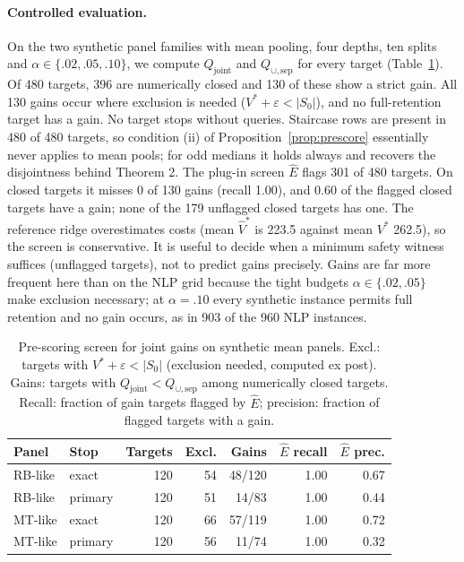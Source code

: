 \documentclass[11pt]{article}
\newcommand{\Qj}{Q_{\mathrm{joint}}}
\newcommand{\Qu}{Q_{\cup,\mathrm{sep}}}
\newcommand{\Sz}{S_0}
\begin{document}
\paragraph{Controlled evaluation.} On the two synthetic panel families with mean pooling, four depths, ten splits and $\alpha\in\{.02,.05,.10\}$, we compute $\Qj$ and $\Qu$ for every target (Table~\ref{tab:predict}). Of 480 targets, 396 are numerically closed and 130 of these show a strict gain. All 130 gains occur where exclusion is needed ($V^*+\varepsilon<|\Sz|$), and no full-retention target has a gain. No target stops without queries. Staircase rows are present in 480 of 480 targets, so condition (ii) of Proposition~\ref{prop:prescore} essentially never applies to mean pools; for odd medians it holds always and recovers the disjointness behind Theorem 2. The plug-in screen $\hat E$ flags 301 of 480 targets. On closed targets it misses 0 of 130 gains (recall 1.00), and 0.60 of the flagged closed targets have a gain; none of the 179 unflagged closed targets has one. The reference ridge overestimates costs (mean $\hat V^*$ is 223.5 against mean $V^*$ 262.5), so the screen is conservative. It is useful to decide when a minimum safety witness suffices (unflagged targets), not to predict gains precisely. Gains are far more frequent here than on the NLP grid because the tight budgets $\alpha\in\{.02,.05\}$ make exclusion necessary; at $\alpha=.10$ every synthetic instance permits full retention and no gain occurs, as in 903 of the 960 NLP instances.

\begin{table}[t]
\centering\small
\setlength{\tabcolsep}{3pt}
\begin{tabular}{@{}llrrrrr@{}}
\toprule
Panel & Stop & Targets & Excl. & Gains & $\hat E$ recall & $\hat E$ prec.\\
\midrule
RB-like & exact & 120 & 54 & 48/120 & 1.00 & 0.67\\
RB-like & primary & 120 & 51 & 14/83 & 1.00 & 0.44\\
MT-like & exact & 120 & 66 & 57/119 & 1.00 & 0.72\\
MT-like & primary & 120 & 56 & 11/74 & 1.00 & 0.32\\
\bottomrule
\end{tabular}
\caption{Pre-scoring screen for joint gains on synthetic mean panels. Excl.: targets with $V^*+\varepsilon<|\Sz|$ (exclusion needed, computed ex post). Gains: targets with $\Qj<\Qu$ among numerically closed targets. Recall: fraction of gain targets flagged by $\hat E$; precision: fraction of flagged targets with a gain.}
\label{tab:predict}
\end{table}
\end{document}
